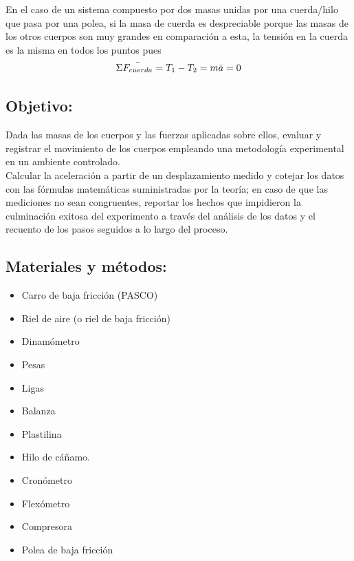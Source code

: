 \documentclass{article}
\begin{document}
En el caso de un sistema compuesto por dos masas unidas por una cuerda/hilo que pasa por una polea, si la masa de cuerda es despreciable porque las masas de los otros cuerpos son muy grandes en comparación a esta, la tensión en la cuerda es la misma en todos los puntos pues\\
\begin{equation}
    \Sigma \Bar{F_{cuerda}} = T_{1} - T_{2} = m\Bar{a} = 0
\end{equation}
 
\subsection{Objetivo:}
Dada las masas de los cuerpos y las fuerzas aplicadas sobre ellos, evaluar y registrar el movimiento de los cuerpos empleando una metodología experimental en un ambiente controlado.\\
Calcular la aceleración a partir de un desplazamiento medido y cotejar los datos con las fórmulas matemáticas suministradas por la teoría; en caso de que las mediciones no sean congruentes, reportar los hechos que impidieron la culminación exitosa del experimento a través del análisis de los datos y el recuento de los pasos seguidos a lo largo del proceso.\\

\subsection{Materiales y métodos:}
\begin{itemize}
    \item Carro de baja fricción (PASCO) 
    \item Riel de aire (o riel de baja fricción)
    \item Dinamómetro
    \item Pesas
    \item Ligas 
    \item Balanza
    \item Plastilina
    \item Hilo de cáñamo.
    \item Cronómetro
    \item Flexómetro
    \item Compresora
    \item Polea de baja fricción
\end{itemize}\\\\
\end{document}
